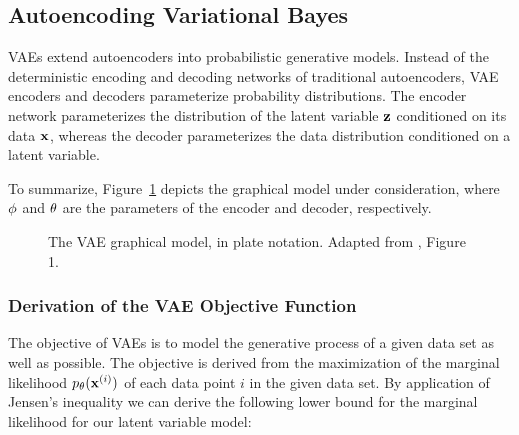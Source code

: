 \subsection{Autoencoding Variational Bayes}

VAEs extend autoencoders into probabilistic generative models. Instead of the deterministic encoding and decoding networks of traditional autoencoders, VAE encoders and decoders parameterize probability distributions. The encoder network parameterizes the distribution of the latent variable $\mathbf{z}$ conditioned on its data $\mathbf{x}$, whereas the decoder parameterizes the data distribution conditioned on a latent variable.


To summarize, Figure~\ref{fig:aevb_plate_notation} depicts the graphical model under consideration, where $\phi$ and $\theta$ are the parameters of the encoder and decoder, respectively.

\begin{figure}[!htb]
  \centering
  \resizebox{0.3\textwidth}{!}{\unskip}
  \caption{The VAE graphical model, in plate notation. Adapted from \cite{aevb}, Figure 1.}
  \label{fig:aevb_plate_notation}
\end{figure}

\subsubsection{Derivation of the VAE Objective Function}


The objective of VAEs is to model the generative process of a given data set as well as possible. The objective is derived from the maximization of the marginal likelihood $p_{\theta}(\mathbf{x}^{(i)})$ of each data point $i$ in the given data set. By application of Jensen's inequality we can derive the following lower bound for the marginal likelihood for our latent variable model:

